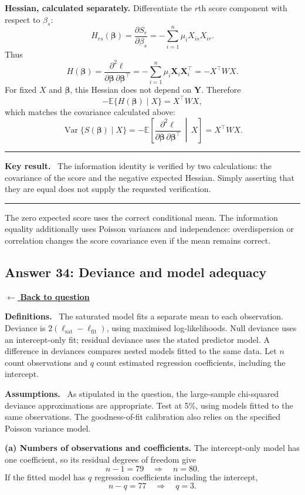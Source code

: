 \documentclass[11pt,a4paper]{article}
\newcommand{\given}{\mathrel{|}}
\newcommand{\E}{\mathbb{E}}
\newcommand{\answernav}[1]{%
  \label{answer:#1}%
  \noindent\hyperref[question:#1]{$\leftarrow$ \textbf{Back to question}}%
  \par\smallskip}
\newcommand{\studyheading}[1]{%
  \par\medskip\noindent\textcolor{statblue}{\textbf{#1.}}\ }
\newenvironment{keyresult}
  {\begin{center}\begin{minipage}{0.92\linewidth}\color{statblue}%
   \hrule\vspace{6pt}\textbf{Key result.}\ }
  {\vspace{6pt}\hrule\end{minipage}\end{center}}
\begin{document}
\textbf{Hessian, calculated separately.}
Differentiate the $r$th score component with respect to $\beta_s$:
\[
H_{rs}(\boldsymbol\beta)
=\frac{\partial S_r}{\partial\beta_s}
=-\sum_{i=1}^n\mu_iX_{is}X_{ir}.
\]
Thus
\[
\boxed{
H(\boldsymbol\beta)
=\frac{\partial^2\ell}
       {\partial\boldsymbol\beta\,\partial\boldsymbol\beta^\top}
=-\sum_{i=1}^n\mu_i\mathbf X_i\mathbf X_i^\top
=-X^\top WX.
}
\]
For fixed $X$ and $\boldsymbol\beta$, this Hessian does not depend on
$\mathbf Y$. Therefore
\[
-\E\{H(\boldsymbol\beta)\given X\}=X^\top WX,
\]
which matches the covariance calculated above:
\[
\boxed{
\operatorname{Var}\{S(\boldsymbol\beta)\given X\}
=-\E\left[
\frac{\partial^2\ell}
     {\partial\boldsymbol\beta\,\partial\boldsymbol\beta^\top}
\,\middle|\,X\right]
=X^\top WX.
}
\]

\begin{keyresult}
The information identity is verified by two calculations: the covariance
of the score and the negative expected Hessian. Simply asserting that
they are equal does not supply the requested verification.
\end{keyresult}

The zero expected score uses the correct conditional mean. The information equality additionally uses Poisson variances and independence: overdispersion or correlation changes the score covariance even if the mean remains correct.

\clearpage

\subsection{Answer 34: Deviance and model adequacy}
\answernav{34}

\studyheading{Definitions}
The saturated model fits a separate mean to each observation.
Deviance is $2(\ell_{\mathrm{sat}}-\ell_{\mathrm{fit}})$, using maximised log-likelihoods.
Null deviance uses an intercept-only fit; residual deviance uses the stated predictor model.
A difference in deviances compares nested models fitted to the same data.
Let $n$ count observations and $q$ count estimated regression coefficients, including the intercept.

\studyheading{Assumptions}
As stipulated in the question, the large-sample chi-squared deviance approximations are appropriate.
Test at 5\%, using models fitted to the same observations.
The goodness-of-fit calibration also relies on the specified Poisson variance model.

\textbf{(a) Numbers of observations and coefficients.}
The intercept-only model has one coefficient, so its residual degrees of
freedom give
\[
n-1=79\quad\Longrightarrow\quad\boxed{n=80}.
\]
If the fitted model has $q$ regression coefficients including the intercept,
\[
n-q=77\quad\Longrightarrow\quad\boxed{q=3}.
\]
\end{document}
